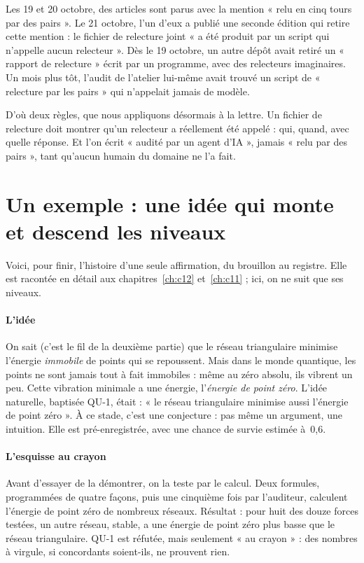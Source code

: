 Les 19 et 20 octobre, des articles sont parus avec la mention « relu en cinq tours par des pairs ». Le 21 octobre,
l'un d'eux a publié une seconde édition qui retire cette mention : le fichier de relecture joint « a été produit par un
script qui n'appelle aucun relecteur ». Dès le
19 octobre, un autre dépôt avait retiré un « rapport de relecture » écrit par un programme, avec des relecteurs
imaginaires. Un mois plus tôt, l'audit de l'atelier lui-même avait trouvé un
script de « relecture par les pairs » qui n'appelait jamais de modèle.

D'où deux règles, que nous appliquons désormais à la lettre. Un fichier de relecture doit montrer qu'un relecteur a
réellement été appelé : qui, quand, avec quelle réponse. Et l'on écrit « audité par un agent d'IA », jamais « relu par
des pairs », tant qu'aucun humain du domaine ne l'a fait.

\section{Un exemple : une idée qui monte et descend les niveaux}

Voici, pour finir, l'histoire d'une seule affirmation, du brouillon au registre. Elle est racontée en détail aux
chapitres~\ref{ch:c12} et~\ref{ch:c11} ; ici, on ne suit que ses niveaux.

\paragraph{L'idée} On sait (c'est le fil de la deuxième partie) que le réseau triangulaire minimise l'énergie
\emph{immobile} de points qui se repoussent. Mais dans le monde quantique, les points ne sont jamais tout à fait
immobiles : même au zéro absolu, ils vibrent un peu. Cette vibration minimale a une énergie, l'\emph{énergie de point
zéro}. L'idée naturelle, baptisée QU-1, était : « le réseau triangulaire minimise aussi l'énergie de point zéro ». À ce
stade, c'est une conjecture : pas même un argument, une intuition. Elle est pré-enregistrée, avec une chance de survie
estimée à~0,6.

\paragraph{L'esquisse au crayon } Avant d'essayer de la démontrer, on la teste par le calcul. Deux
formules, programmées de quatre façons, puis une cinquième fois par l'auditeur, calculent l'énergie de point zéro de nombreux réseaux. Résultat : pour huit des douze forces
testées, un autre réseau, stable, a une énergie de point zéro plus basse que le réseau triangulaire. QU-1 est réfutée,
mais seulement « au crayon » : des nombres à virgule, si concordants soient-ils, ne prouvent rien.

